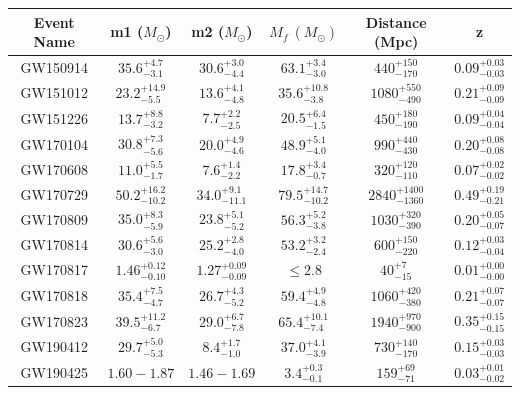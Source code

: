\documentclass [12pt, proquest]{uwthesis}[2019]
\begin{document}
\begin{center}
\begin{tabular}{| c | c | c | c | c | c |}
\hline
Event Name & m1 ($M_\odot$) & m2 ($M_\odot$) & $M_f\ (M_\odot)$ & Distance (Mpc) & z\\
\hline \hline
GW150914 & $35.6^{+4.7}_{-3.1}$ & $30.6^{+3.0}_{-4.4}$ & $63.1^{+3.4}_{-3.0}$ & $440^{+150}_{-170}$ & $0.09^{+0.03}_{-0.03}$\\
\hline
GW151012 & $23.2^{+14.9}_{-5.5}$ & $13.6^{+4.1}_{-4.8}$  & $35.6^{+10.8}_{-3.8}$ & $1080^{+550}_{-490}$& $0.21^{+0.09}_{-0.09}$\\
\hline
GW151226 & $13.7^{+8.8}_{-3.2}$ & $7.7^{+2.2}_{-2.5}$ & $20.5^{+6.4}_{-1.5}$ & $450^{+180}_{-190}$ & $0.09^{+0.04}_{-0.04}$\\
\hline
\hline
GW170104 & $30.8^{+7.3}_{-5.6}$ & $20.0^{+4.9}_{-4.6}$ & $48.9^{+5.1}_{-4.0}$ & $990^{+440}_{-430}$ & $0.20^{+0.08}_{-0.08}$\\
\hline
GW170608 & $11.0^{+5.5}_{-1.7}$ & $7.6^{+1.4}_{-2.2}$ & $17.8^{+3.4}_{-0.7}$ & $320^{+120}_{-110}$ & $0.07^{+0.02}_{-0.02}$\\
\hline
GW170729 & $50.2^{+16.2}_{-10.2}$ & $34.0^{+9.1}_{-11.1}$ & $79.5^{+14.7}_{-10.2}$ & $2840^{+1400}_{-1360}$ & $0.49^{+0.19}_{-0.21}$\\
\hline
GW170809 & $35.0^{+8.3}_{-5.9}$ & $23.8^{+5.1}_{-5.2}$ & $56.3^{+5.2}_{-3.8}$ & $1030^{+320}_{-390}$ & $0.20^{+0.05}_{-0.07}$\\
\hline
GW170814 & $30.6^{+5.6}_{-3.0}$ & $25.2^{+2.8}_{-4.0}$ & $53.2^{+3.2}_{-2.4}$ & $600^{+150}_{-220}$ & $0.12^{+0.03}_{-0.04}$\\
\hline
GW170817 & $1.46^{+0.12}_{-0.10}$ & $1.27^{+0.09}_{-0.09}$ & $\le2.8$ & $40^{+7}_{-15}$ & $0.01^{+0.00}_{-0.00}$\\
\hline
GW170818 & $35.4^{+7.5}_{-4.7}$ & $26.7^{+4.3}_{-5.2}$ & $59.4^{+4.9}_{-4.8}$ & $1060^{+420}_{-380}$ & $0.21^{+0.07}_{-0.07}$\\
\hline
GW170823 & $39.5^{+11.2}_{-6.7}$ & $29.0^{+6.7}_{-7.8}$ & $65.4^{+10.1}_{-7.4}$ & $1940^{+970}_{-900}$ & $0.35^{+0.15}_{-0.15}$\\
\hline
\hline
GW190412 & $29.7^{+5.0}_{-5.3}$ & $8.4^{+1.7}_{-1.0}$ & $37.0^{+4.1}_{-3.9}$ & $730^{+140}_{-170}$ & $0.15^{+0.03}_{-0.03}$\\
\hline
GW190425 & $1.60-1.87$ & $1.46-1.69$ & $3.4^{+0.3}_{-0.1}$ & $159^{+69}_{-71}$ & $0.03^{+0.01}_{-0.02}$\\
\hline
\end{tabular}
\label{gwTable}
\end{center}
\end{document}

